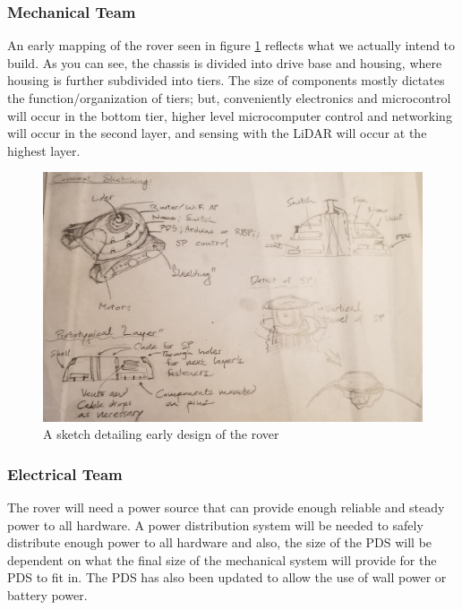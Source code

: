 \documentclass[a4paper, 10pt]{article}
\begin{document}
		\subsubsection*{Mechanical Team}
		An early mapping of the rover seen in figure \ref{layered_sketch} reflects what we actually intend to build. As you can see, the chassis is divided into drive base and housing, where housing is further subdivided into tiers. The size of components mostly dictates the function/organization of tiers; but, conveniently electronics and microcontrol will occur in the bottom tier, higher level microcomputer control and networking will occur in the second layer, and sensing with the LiDAR will occur at the highest layer.
		
		\begin{figure} [!h]
			\centering
			\includegraphics[scale=0.1, angle=90]{Photos/sketch}
			\caption{A sketch detailing early design of the rover}
			\label{layered_sketch}
		\end{figure}
\pagebreak
		\subsubsection*{Electrical Team}
		The rover will need a power source that can provide enough reliable and steady power to all hardware. A power distribution system will be needed to safely distribute enough power to all hardware and also, the size of the PDS will be dependent on what the final size of the mechanical system will provide for the PDS to fit in. The PDS has also been updated to allow the use of wall power or battery power.
		
\end{document}
